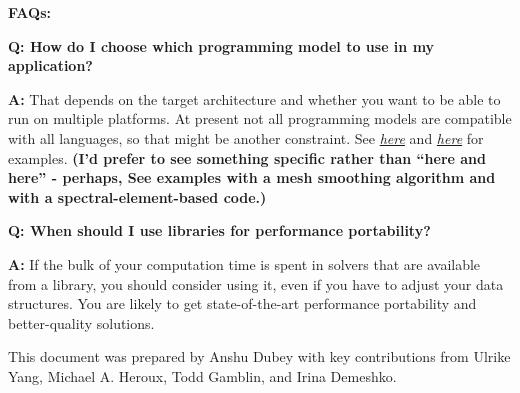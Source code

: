 \documentclass[]{article}
\begin{document}
\textbf{FAQs:}

\textbf{Q: How do I choose which programming model to use in my
application?}

\textbf{A:} That depends on the target architecture and whether you want
to be able to run on multiple platforms. At present not all programming
models are compatible with all languages, so that might be another
constraint. See
\href{http://www.imr.sandia.gov/papers/imr24/RN18_IMR24_Quadros.pdf}{\emph{here}}
and \href{http://dx.doi.org/10.1177/1094342012462751}{\emph{here}} for
examples. \textbf{(I'd prefer to see something specific rather than
``here and here'' - perhaps, See examples with a mesh smoothing
algorithm and with a spectral-element-based code.)}

\textbf{Q: When should I use libraries for performance portability?}

\textbf{A:} If the bulk of your computation time is spent in solvers
that are available from a library, you should consider using it, even if
you have to adjust your data structures. You are likely to get
state-of-the-art performance portability and better-quality solutions.

This document was prepared by Anshu Dubey with key contributions from
Ulrike Yang, Michael A. Heroux, Todd Gamblin, and Irina Demeshko.
\end{document}
